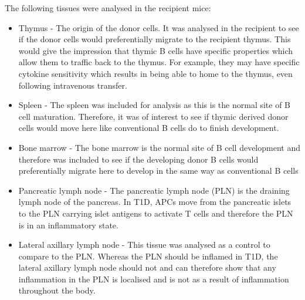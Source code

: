 The following tissues were analysed in the recipient mice:
\begin{itemize}
\item Thymus - The origin of the donor cells. It was analysed in the recipient to see if the donor cells would preferentially migrate to the recipient thymus.
This would give the impression that thymic B cells have specific properties which allow them to traffic back to the thymus.
For example, they may have specific cytokine sensitivity which results in being able to home to the thymus, even following intravenous transfer.
\item Spleen - The spleen was included for analysis as this is the normal site of B cell maturation.
Therefore, it was of interest to see if thymic derived donor cells would move here like conventional B cells do to finish development.
\item Bone marrow - The bone marrow is the normal site of B cell development and therefore was included to see if the developing donor B cells would preferentially migrate here to develop in the same way as conventional B cells
\item Pancreatic lymph node - The pancreatic lymph node (PLN) is the draining lymph node of the pancreas.
In T1D, APCs move from the pancreatic islets to the PLN carrying islet antigens to activate T cells and therefore the PLN is in an inflammatory state.
\item Lateral axillary lymph node - This tissue was analysed as a control to compare to the PLN.
Whereas the PLN should be inflamed in T1D, the lateral axillary lymph node should not and can therefore show that any inflammation in the PLN is localised and is not as a result of inflammation throughout the body.
\end{itemize}


